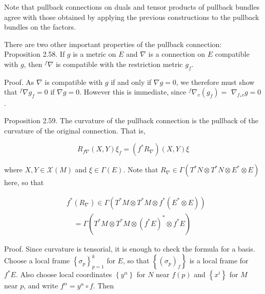 \documentclass[10pt, letterpaper]{article}
\begin{document}
Note that pullback connections on duals and tensor products of pullback bundles agree with those obtained by applying the previous constructions to the pullback bundles on the factors.

There are two other important properties of the pullback connection:\\
Proposition 2.58. If $g$ is a metric on $E$ and $\nabla$ is a connection on $E$ compatible with $g$, then ${ }^{f} \nabla$ is compatible with the restriction metric $g_{f}$.

Proof. As $\nabla$ is compatible with $g$ if and only if $\nabla g=0$, we therefore must show that ${ }^{f} \nabla g_{f}=0$ if $\nabla g=0$. However this is immediate, since ${ }^{f} \nabla_{v}\left(g_{f}\right)=$ $\nabla_{f_{*} v} g=0$.

Proposition 2.59. The curvature of the pullback connection is the pullback of the curvature of the original connection. That is,

$$
R_{f \nabla}(X, Y) \xi_{f}=\left(f^{*} R_{\nabla}\right)(X, Y) \xi
$$

where $X, Y \in \mathscr{X}(M)$ and $\xi \in \Gamma(E)$. Note that $R_{\nabla} \in \Gamma\left(T^{*} N \otimes T^{*} N \otimes E^{*} \otimes E\right)$ here, so that

$$
\begin{aligned}
& f^{*}\left(R_{\nabla}\right) \in \Gamma\left(T^{*} M \otimes T^{*} M \otimes f^{*}\left(E^{*} \otimes E\right)\right) \\
& \quad=\Gamma\left(T^{*} M \otimes T^{*} M \otimes\left(f^{*} E\right)^{*} \otimes f^{*} E\right)
\end{aligned}
$$

Proof. Since curvature is tensorial, it is enough to check the formula for a basis. Choose a local frame $\left\{\sigma_{p}\right\}_{p=1}^{k}$ for $E$, so that $\left\{\left(\sigma_{p}\right)_{f}\right\}$ is a local frame for $f^{*} E$. Also choose local coordinates $\left\{y^{\alpha}\right\}$ for $N$ near $f(p)$ and $\left\{x^{i}\right\}$ for $M$ near $p$, and write $f^{\alpha}=y^{\alpha} \circ f$. Then
\end{document}
